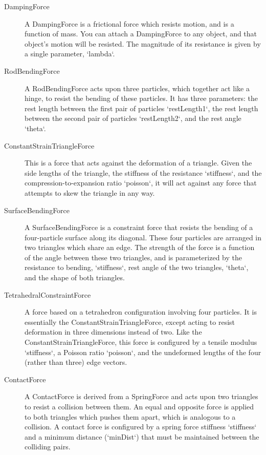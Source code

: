 \documentclass[letterpaper]{article}
\begin{document}
\begin{description}
\item[DampingForce] A DampingForce is a frictional force which resists
  motion, and is a function of mass. You can attach a DampingForce to
  any object, and that object's motion will be resisted. The magnitude
  of its resistance is given by a single parameter, `lambda`.

\item[RodBendingForce] A RodBendingForce acts upon three particles, which
  together act like a hinge, to resist the bending of these
  particles. It has three parameters: the rest length between the
  first pair of particles `restLength1`, the rest length between the
  second pair of particles `restLength2`, and the rest angle `theta`.

\item[ConstantStrainTriangleForce] This is a force that acts against the
  deformation of a triangle. Given the side lengths of the triangle,
  the stiffness of the resistance `stiffness`, and the
  compression-to-expansion ratio `poisson`, it will act against any
  force that attempts to skew the triangle in any way.

\item[SurfaceBendingForce] A SurfaceBendingForce is a constraint force that
  resists the bending of a four-particle surface along its diagonal.
  These four particles are arranged in two triangles which share an
  edge. The strength of the force is a function of the angle between
  these two triangles, and is parameterized by the resistance to
  bending, `stiffness`, rest angle of the two triangles, `theta`, and
  the shape of both triangles.

\item[TetrahedralConstraintForce] A force based on a tetrahedron
  configuration involving four particles. It is essentially the
  ConstantStrainTriangleForce, except acting to resist deformation in
  three dimensions instead of two. Like the
  ConstantStrainTriangleForce, this force is configured by a tensile
  modulus `stiffness`, a Poisson ratio `poisson`, and the undeformed
  lengths of the four (rather than three) edge vectors.

\item[ContactForce] A ContactForce is derived from a SpringForce and acts
  upon two triangles to resist a collision between them. An equal and
  opposite force is applied to both triangles which pushes them apart,
  which is analogous to a collision. A contact force is configured by
  a spring force stiffness `stiffness` and a minimum distance
  (`minDist`) that must be maintained between the colliding pairs.
\end{description}
\end{document}
